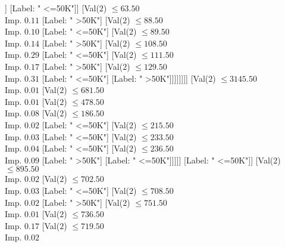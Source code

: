 \documentclass[margin=10pt]{standalone}
\begin{document}
\begin{forest}
																	[Val($2$) $ \leq 2.50$ \\ Imp. $1.00$
																		[Label: " <=50K"]
																		[Label: " >50K"]]
																	[Label: " <=50K"]]
																[Val($2$) $ \leq 63.50$ \\ Imp. $0.11$
																	[Label: " >50K"]
																	[Val($2$) $ \leq 88.50$ \\ Imp. $0.10$
																		[Label: " <=50K"]
																		[Val($2$) $ \leq 89.50$ \\ Imp. $0.14$
																			[Label: " >50K"]
																			[Val($2$) $ \leq 108.50$ \\ Imp. $0.29$
																				[Label: " <=50K"]
																				[Val($2$) $ \leq 111.50$ \\ Imp. $0.17$
																					[Label: " >50K"]
																					[Val($2$) $ \leq 129.50$ \\ Imp. $0.31$
																						[Label: " <=50K"]
																						[Label: " >50K"]]]]]]]]
															[Val($2$) $ \leq 3145.50$ \\ Imp. $0.01$
																[Val($2$) $ \leq 681.50$ \\ Imp. $0.01$
																	[Val($2$) $ \leq 478.50$ \\ Imp. $0.08$
																		[Val($2$) $ \leq 186.50$ \\ Imp. $0.02$
																			[Label: " <=50K"]
																			[Val($2$) $ \leq 215.50$ \\ Imp. $0.03$
																				[Label: " <=50K"]
																				[Val($2$) $ \leq 233.50$ \\ Imp. $0.04$
																					[Label: " <=50K"]
																					[Val($2$) $ \leq 236.50$ \\ Imp. $0.09$
																						[Label: " >50K"]
																						[Label: " <=50K"]]]]]
																		[Label: " <=50K"]]
																	[Val($2$) $ \leq 895.50$ \\ Imp. $0.02$
																		[Val($2$) $ \leq 702.50$ \\ Imp. $0.03$
																			[Label: " <=50K"]
																			[Val($2$) $ \leq 708.50$ \\ Imp. $0.02$
																				[Label: " >50K"]
																				[Val($2$) $ \leq 751.50$ \\ Imp. $0.01$
																					[Val($2$) $ \leq 736.50$ \\ Imp. $0.17$
																						[Val($2$) $ \leq 719.50$ \\ Imp. $0.02$

\end{forest}
\end{document}
